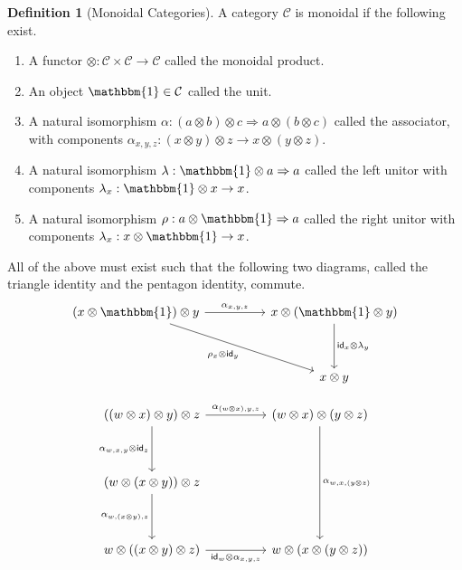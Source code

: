\documentclass[12pt]{article}
\theoremstyle{definition}
\newtheorem{definition}{Definition}
\begin{document}
\begin{definition}[Monoidal Categories]
    A category $\mathcal{C}$ is monoidal if the following exist.
    \begin{enumerate}
        \item A functor $\otimes:\mathcal{C}\times\mathcal{C}\rightarrow\mathcal{C}$ called the monoidal product.
        \item An object $\mathbbm{1}\in\mathcal{C}$ called the unit.
        \item A natural isomorphism $\alpha : (a\otimes b)\otimes c\Rightarrow a\otimes (b\otimes c)$ called the associator, with components $\alpha_{x,y,z}: (x\otimes y)\otimes z\rightarrow x\otimes (y\otimes z)$.
        \item A natural isomorphism $\lambda : \mathbbm{1}\otimes a\Rightarrow a$ called the left unitor with components $\lambda_x : \mathbbm{1}\otimes x\rightarrow x$.
        \item A natural isomorphism $\rho : a\otimes \mathbbm{1}\Rightarrow a$ called the right unitor with components $\lambda_x : x\otimes \mathbbm{1}\rightarrow x$.
    \end{enumerate}
    All of the above must exist such that the following two diagrams, called the triangle identity and the pentagon identity, commute.
    \[\begin{tikzcd}
            {(x\otimes\mathbbm{1})\otimes y} && {x\otimes(\mathbbm{1}\otimes y)} \\
            \\
            && {x\otimes y}
            \arrow["{{\rho_x\otimes \mathsf{id}_y}}"', from=1-1, to=3-3]
            \arrow["{{\mathsf{id}_x\otimes\lambda_y}}", from=1-3, to=3-3]
            \arrow["{{\alpha_{x,y,z}}}", from=1-1, to=1-3]
        \end{tikzcd}\]

    \[\begin{tikzcd}
            {((w\otimes x)\otimes y)\otimes z} && {(w\otimes x)\otimes(y\otimes z)} \\
            \\
            {(w\otimes (x\otimes y))\otimes z} \\
            \\
            {w\otimes ((x\otimes y)\otimes z)} && {w\otimes (x\otimes (y\otimes z))}
            \arrow["{{\alpha_{w,x,(y\otimes z)}}}", from=1-3, to=5-3]
            \arrow["{{\alpha_{(w\otimes x),y,z}}}", from=1-1, to=1-3]
            \arrow["{{\alpha_{w,x,y}\otimes \mathsf{id}_z}}"', from=1-1, to=3-1]
            \arrow["{{\alpha_{w,(x\otimes y),z}}}"', from=3-1, to=5-1]
            \arrow["{{\mathsf{id}_w\otimes \alpha_{x,y,z}}}"', from=5-1, to=5-3]
        \end{tikzcd}\]
\end{definition}
\end{document}
